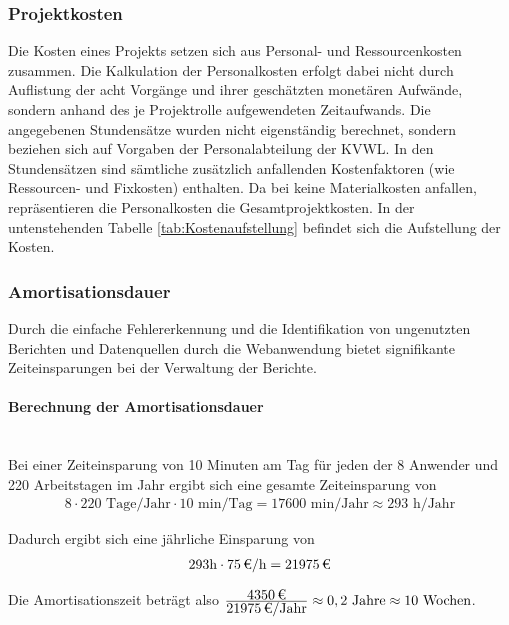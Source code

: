 \subsubsection{Projektkosten}\label{sec:Projektkosten}
Die Kosten eines Projekts setzen sich aus Personal- und Ressourcenkosten zusammen. Die Kalkulation der Personalkosten erfolgt dabei nicht durch Auflistung der acht Vorgänge und ihrer geschätzten monetären Aufwände, sondern anhand des je Projektrolle aufgewendeten Zeitaufwands. Die angegebenen Stundensätze wurden nicht eigenständig berechnet, sondern beziehen sich auf Vorgaben der Personalabteilung der \ac{KVWL}. In den Stundensätzen sind sämtliche zusätzlich anfallenden Kostenfaktoren (wie Ressourcen- und Fixkosten) enthalten. Da bei \projektName keine Materialkosten anfallen, repräsentieren die Personalkosten die Gesamtprojektkosten. In der untenstehenden Tabelle \ref{tab:Kostenaufstellung} befindet sich die Aufstellung der Kosten.

\subsubsection{Amortisationsdauer}\label{sec:Amortisationsdauer}
Durch die einfache Fehlererkennung und die Identifikation von ungenutzten Berichten und Datenquellen durch die Webanwendung bietet \projektName signifikante Zeiteinsparungen bei der Verwaltung der Berichte.

\paragraph{Berechnung der Amortisationsdauer}~\\
Bei einer Zeiteinsparung von 10 Minuten am Tag für jeden der 8 Anwender und 220 Arbeitstagen im Jahr ergibt sich eine gesamte Zeiteinsparung von 
\begin{eqnarray}
8 \cdot 220 \mbox{ Tage/Jahr} \cdot 10 \mbox{ min/Tag} = 17600 \mbox{ min/Jahr} \approx 293 \mbox{ h/Jahr} 
\end{eqnarray}

Dadurch ergibt sich eine jährliche Einsparung von 
\begin{eqnarray}
293 \mbox{h} \cdot \eur{75}{\mbox{/h}} = \eur{21975}
\end{eqnarray}

Die Amortisationszeit beträgt also \(\frac{\eur{4350}}{\eur{21975}\mbox{/Jahr}} \approx 0,2 \mbox{ Jahre} \approx 10 \mbox{ Wochen}\).

